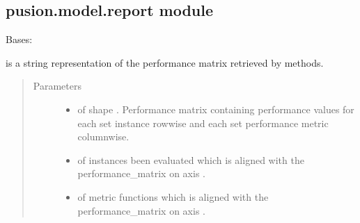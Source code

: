 \documentclass[letterpaper,10pt,english]{sphinxmanual}
\begin{document}
\subsection{pusion.model.report module}
\label{\detokenize{pusion.model.report:module-pusion.model.report}}\label{\detokenize{pusion.model.report:pusion-model-report-module}}\label{\detokenize{pusion.model.report::doc}}

\begin{fulllineitems}
\label{\detokenize{pusion.model.report:pusion.model.report.Report}}
\sphinxAtStartPar
Bases: 

\sphinxAtStartPar
{\hyperref[\detokenize{pusion.model.report:pusion.model.report.Report}]{}} is a string representation of the performance matrix retrieved by  methods.
\begin{quote}\begin{description}
\item[{Parameters}] \leavevmode\begin{itemize}
\item {} 
\sphinxAtStartPar
{} \textendash{}  of shape . Performance matrix containing
performance values for each set instance row\sphinxhyphen{}wise and each set performance metric column\sphinxhyphen{}wise.

\item {} 
\sphinxAtStartPar
{} \textendash{}  of instances been evaluated which is aligned with the performance\_matrix on axis .

\item {} 
\sphinxAtStartPar
{} \textendash{}  of metric functions which is aligned with the performance\_matrix on axis .

\end{itemize}

\end{description}\end{quote}

\end{fulllineitems}
\end{document}
